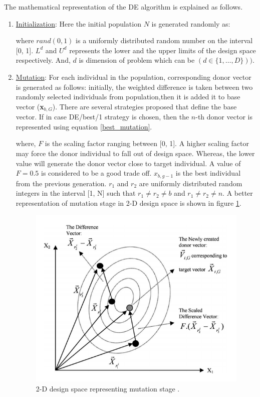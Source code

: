 The mathematical representation of the DE algorithm is explained as follows.
\begin{enumerate}
\item \underline{Initialization}: Here the initial population $N$ is generated randomly as: 

where $rand(0, 1)$ is a uniformly distributed random number on the interval [0, 1]. $L^d$ and $U^d$ represents the lower and the upper limits of the design space respectively. And, $d$ is dimension of problem which can be $(d\in\{1, \ldots, D\}))$.

\item \underline{Mutation}: For each individual in the population, corresponding donor vector is generated as follows: initially, the weighted difference is taken between two randomly selected individuals from population,then it is added it to base vector (\textbf{x}$_{b,G}$). There are several strategies proposed that define the base vector. If in case DE/best/1 strategy is chosen, then the \(n\)-th donor vector is represented using equation \ref{best_mutation}. 

where, $F$ is the scaling factor ranging between [0, 1]. A higher scaling factor may force the donor individual to fall out of design space. Whereas, the lower value will generate the donor vector close to target individual. A value of $F = 0.5$ is considered to be a good trade off. $x_{b,g-1}$ is the best individual from the previous generation. $r_1$ and $r_2$ are uniformly distributed random integers in the interval [1, N] such that \(r_{1} \neq r_{2} \neq b\) and \(r_{1} \neq r_{2} \neq n\). A better representation of mutation stage in 2-D design space is shown in figure \ref{mutation}.
\begin{figure}[!ht]
    \centering
    \includegraphics[scale = 0.5]{figures/mutation.png}
    \caption{2-D design space representing mutation stage \cite{storn}.}
    \label{mutation}
\end{figure}


\end{enumerate}

